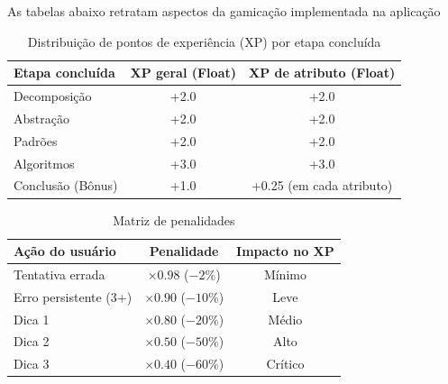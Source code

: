 As tabelas abaixo retratam aspectos da gamicação implementada na aplicação

\begin{table}[htbp]

    \centering
  \caption{\label{table:pontos_xp}Distribuição de pontos de experiência (XP) por etapa concluída}

  \begin{tabular}{|l|c|c|} %

  \hline

  \textbf{Etapa concluída} & \textbf{XP geral (Float)} & \textbf{XP de atributo (Float)} \\ \hline

  Decomposição & +2.0 & +2.0 \\ \hline

  Abstração & +2.0 & +2.0 \\ \hline

  Padrões & +2.0 & +2.0 \\ \hline

  Algoritmos & +3.0 & +3.0 \\ \hline

  Conclusão (Bônus) & +1.0 & +0.25 (em cada atributo) \\ \hline

  \end{tabular}


\end{table}


\begin{table}[htbp]

  \centering

  \caption{\label{table:penalidades_xp}Matriz de penalidades}

  \begin{tabular}{|l|c|c|}

  \hline

  \textbf{Ação do usuário} & \textbf{Penalidade} & \textbf{Impacto no XP} \\ \hline

  Tentativa errada & $\times 0.98$ ($-2\%$) & Mínimo \\ \hline

  Erro persistente (3+) & $\times 0.90$ ($-10\%$) & Leve \\ \hline

  Dica 1 & $\times 0.80$ ($-20\%$) & Médio \\ \hline

  Dica 2 & $\times 0.50$ ($-50\%$) & Alto \\ \hline

  Dica 3 & $\times 0.40$ ($-60\%$) & Crítico \\ \hline

  \end{tabular}


\end{table}

